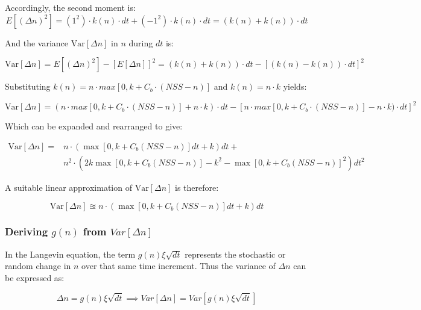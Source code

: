 \documentclass[]{article}
\begin{document}
Accordingly, the second moment is:
\begin{equation}
	E[(\Delta n)^2] = (1^2) \cdot k(n) \cdot dt + (-1^2) \cdot k(n) \cdot dt = (k(n) + k(n)) \cdot dt
\end{equation}

And the variance \( \text{Var}[\Delta n] \) in \( n \) during \( dt \) is:

\begin{equation}
	\text{Var}[\Delta n] = E[(\Delta n)^2] - [E[\Delta n]]^2 = (k(n) + k(n)) \cdot dt - [(k(n) - k(n)) \cdot dt]^2
\end{equation}

Substituting $k(n) = n \cdot max[0, k + C_b \cdot (NSS-n)]$ and $k(n) = n \cdot k$ yields:

\begin{equation}
	\text{Var}[\Delta n] = (n \cdot max[0, k + C_b \cdot (NSS-n)] + n \cdot k) \cdot dt - [n \cdot max[0, k + C_b \cdot (NSS-n)] - n \cdot k) \cdot dt]^2
\end{equation}

Which can be expanded and rearranged to give:

\begin{equation}
\begin{aligned}
\text{Var}[\Delta n] = &  n \cdot (\max [0,k+C_b (NSS-n)] dt + k) dt + \\
	 & n^2 \cdot (2 k \max [0,k+C_b (NSS-n)] - k^2 - \max [0,k+C_b (NSS-n)]^2) dt^2  
\end{aligned}
\end{equation}

A suitable linear approximation of \( \text{Var}[\Delta n] \) is therefore:

\begin{equation} \label{eq:delta_n_variance}
	\text{Var}[\Delta n] \approxeq  n \cdot (\max [0,k+C_b (NSS-n)] dt + k) dt
\end{equation}

\subsubsection*{Deriving \( g(n) \) from \( Var[\Delta n]\)}

In the Langevin equation, the term \( g(n) \xi \sqrt{dt} \) represents the stochastic or random change in \( n \) over that same time increment. Thus the variance of $\Delta n$ can be expressed as:

\begin{equation}
	\Delta n = g(n) \xi \sqrt{dt} \implies Var[\Delta n] = Var[g(n) \xi \sqrt{dt}]
\end{equation}
\end{document}
